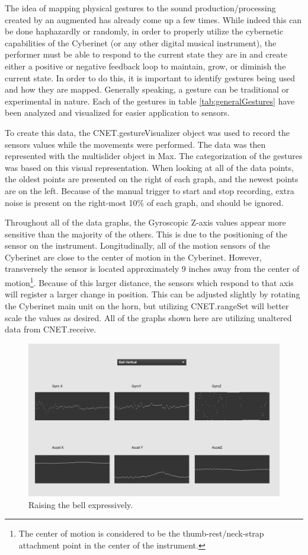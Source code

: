 The idea of mapping physical gestures to the sound production/processing created by an augmented has already come up a few times. While indeed this can be done haphazardly or randomly, in order to properly utilize the cybernetic capabilities of the Cyberinet (or any other digital musical instrument), the performer must be able to respond to the current state they are in and create either a positive or negative feedback loop to maintain, grow, or diminish the current state. In order to do this, it is important to identify gestures being used and how they are mapped. Generally speaking, a gesture can be traditional or experimental in nature. Each of the gestures in table \ref{tab:generalGestures} have been analyzed and visualized for easier application to sensors.

To create this data, the CNET.gestureVisualizer object was used to record the sensors values while the movements were performed. The data was then represented with the multislider object in Max. The categorization of the gestures was based on this visual representation. When looking at all of the data points, the oldest points are presented on the right of each graph, and the newest points are on the left. Because of the manual trigger to start and stop recording, extra noise is present on the right-most 10\% of each graph, and should be ignored. 

Throughout all of the data graphs, the Gyroscopic Z-axis values appear more sensitive than the majority of the others. This is due to the positioning of the sensor on the instrument. Longitudinally, all of the motion sensors of the Cyberinet are close to the center of motion in the Cyberinet. However, transversely the sensor is located approximately 9 inches away from the center of motion\footnote{The center of motion is considered to be the thumb-rest/neck-strap attachment point in the center of the instrument.}. Because of this larger distance, the sensors which respond to that axis will register a larger change in position. This can be adjusted slightly by rotating the Cyberinet main unit on the horn, but utilizing CNET.rangeSet will better scale the values as desired. All of the graphs shown here are utilizing unaltered data from CNET.receive.

\begin{figure}
    \centering
    \includegraphics[scale=0.25]{diagrams/gestureData/bellVert.png}
    \caption{Raising the bell expressively.}
    \label{fig:bellRaiseData}
\end{figure}

